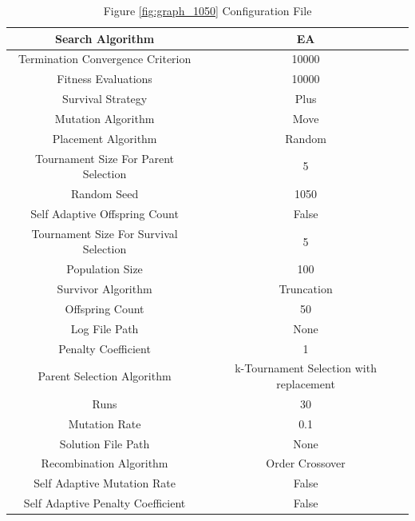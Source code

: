 \documentclass{standalone}
\begin{document}
\begin{table}[!htb]
	\centering
	\caption{Figure \ref{fig:graph_1050} Configuration File}
	\label{tab:graph_1050}
	\begin{tabular}{| c | c |}
		\hline
		Search Algorithm		& EA		 \\
		\hline
		Termination Convergence Criterion		& 10000		 \\
		\hline
		Fitness Evaluations		& 10000		 \\
		\hline
		Survival Strategy		& Plus		 \\
		\hline
		Mutation Algorithm		& Move		 \\
		\hline
		Placement Algorithm		& Random		 \\
		\hline
		Tournament Size For Parent Selection		& 5		 \\
		\hline
		Random Seed		& 1050		 \\
		\hline
		Self Adaptive Offspring Count		& False		 \\
		\hline
		Tournament Size For Survival Selection		& 5		 \\
		\hline
		Population Size		& 100		 \\
		\hline
		Survivor Algorithm		& Truncation		 \\
		\hline
		Offspring Count		& 50		 \\
		\hline
		Log File Path		& None		 \\
		\hline
		Penalty Coefficient		& 1		 \\
		\hline
		Parent Selection Algorithm		& k-Tournament Selection with replacement		 \\
		\hline
		Runs		& 30		 \\
		\hline
		Mutation Rate		& 0.1		 \\
		\hline
		Solution File Path		& None		 \\
		\hline
		Recombination Algorithm		& Order Crossover		 \\
		\hline
		Self Adaptive Mutation Rate		& False		 \\
		\hline
		Self Adaptive Penalty Coefficient		& False		 \\
		\hline
	\end{tabular}
\end{table}
\end{document}
